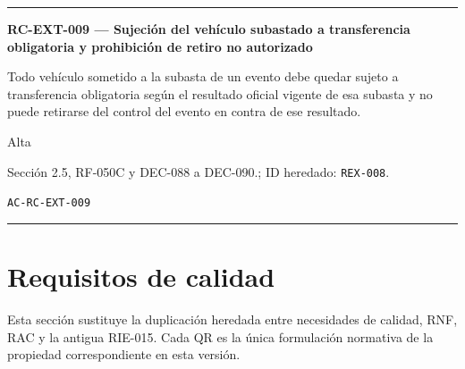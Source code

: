 \documentclass[10pt,letterpaper]{article}
\begin{document}
\vspace{0.25em}\hrule\vspace{0.65em}
\noindent\textbf{RC-EXT-009 --- Sujeción del vehículo subastado a transferencia obligatoria y prohibición de retiro no autorizado}\par
\begin{description}[style=nextline,leftmargin=3.15cm,labelwidth=2.8cm,font=\normalfont\bfseries]
\item[Obligación] Todo vehículo sometido a la subasta de un evento debe quedar sujeto a transferencia obligatoria según el resultado oficial vigente de esa subasta y no puede retirarse del control del evento en contra de ese resultado.
\item[Prioridad] Alta
\item[Procedencia] Sección 2.5, RF-050C y DEC-088 a DEC-090.; ID heredado: \texttt{REX-008}.
\item[Verificación] \texttt{AC-RC-EXT-009}
\end{description}
\vspace{0.25em}\hrule\vspace{0.65em}
\section{Requisitos de calidad}
Esta sección sustituye la duplicación heredada entre necesidades de calidad, RNF, RAC y la antigua RIE-015. Cada QR es la única formulación normativa de la propiedad correspondiente en esta versión.
\end{document}
